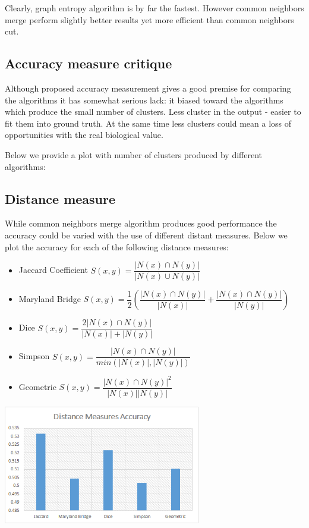 \documentclass[journal]{IEEEtran}
\begin{document}
Clearly, graph entropy algorithm is by far the fastest. However common neighbors merge perform slightly better results yet more efficient than common neighbors cut. 

\subsection{Accuracy measure critique}
Although proposed accuracy measurement gives a good premise for comparing the algorithms it has somewhat serious lack: it biased toward the algorithms which produce the small number of clusters. Less cluster in the output - easier to fit them into ground truth. At the same time less clusters could mean a loss of opportunities with the real biological value. 

Below we provide a plot with number of clusters produced by different algorithms:


\subsection{Distance measure}
While common neighbors merge algorithm produces good performance the accuracy could be varied with the use of different distant measures. Below we plot the accuracy for each of the following distance measures:
\begin{itemize}
	\item Jaccard Coefficient $S(x,y)=\dfrac{|N(x) \cap N(y)|}{|N(x) \cup N(y)|}$
	\item Maryland Bridge $S(x,y)=\dfrac{1}{2} (\dfrac{|N(x) \cap N(y)|}{|N(x)|} + \dfrac{|N(x) \cap N(y)|}{|N(y)|})$
	\item Dice $S(x,y)=\dfrac{2|N(x) \cap N(y)|}{|N(x)| + |N(y)|}$
	\item Simpson $S(x,y)=\dfrac{|N(x) \cap N(y)|}{min(|N(x)|, |N(y)|)}$
	\item Geometric $S(x,y)=\dfrac{|N(x) \cap N(y)|^2}{|N(x)| |N(y)|}$
\end{itemize}

\includegraphics[width=3.4in,clip,keepaspectratio]{distance-measures}
\end{document}
